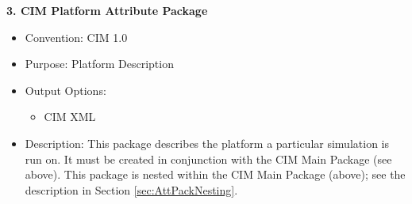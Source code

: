 \vspace{.20in}


{\bf 3. CIM Platform Attribute Package}

\begin{itemize}
    \item Convention: CIM 1.0
    \item Purpose: Platform Description
    \item Output Options:
    \begin{itemize}
       \item CIM XML 
    \end{itemize} 
    \item Description: This package describes the platform a particular simulation is run on. It must be created in conjunction with the CIM Main Package (see above). This package is nested within the CIM Main Package (above); see the description in Section \ref{sec:AttPackNesting}.
\end{itemize}



